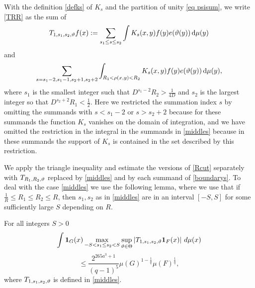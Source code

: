 With the definition \eqref{defks} of $K_s$
and the partition of unity \eqref{eq psisum}, we write \eqref{TRR} as the sum of
\begin{equation}\label{middles}
{T}_{1,s_1,s_2,\vartheta}f(x):=\sum_{s_1 \le s\le s_2}
\int K_s(x,y)  f(y) e(\vartheta(y)) \, \mathrm{d}\mu(y)
\end{equation}
and
\begin{equation}\label{boundarys}
\sum_{s=s_1-2,s_1-1, s_2+1, s_2+2}
\int_{R_1 <  \rho(x,y) < R_2}  K_s(x,y) f(y) e(\vartheta(y)) \,
 \mathrm{d}\mu(y),
\end{equation}
where $s_1$ is the smallest integer such that $D^{s_1-2}R_2>\frac 1{4D}$ and $s_2$
is the largest integer so that $D^{s_2+2}R_1<\frac 12$. Here we restricted the summation index $s$
by omitting the summands with $s<s_1-2$
or $s>s_2+2$ because for these summands the function $K_s$ vanishes on the domain of integration, and we have omitted the restriction in the integral
in the  summands in \eqref{middles} because in these summands the support of $K_s$ is contained in
the set described by this restriction.



We apply the triangle inequality and estimate the
versions of \eqref{Rcut} separately with $T_{R_1,R_2,\vartheta}$ replaced by
\eqref{middles} and by each summand of \eqref{boundarys}.
To deal with the case \eqref{middles} we use the following lemma, where we use that if
$\frac 1R\le R_1\le R_2\le R$, then $s_1,s_2$
as in \eqref{middles} are in an interval $[-S,S]$ for some
sufficiently large $S$ depending on $R$.


\begin{lemma}\label{S truncation}
For all integers $S>0$
$$
    \int \mathbf{1}_{G}(x)
    \max_{-S<s_1\le s_2<S}\sup_{\vartheta\in\Theta}
    \left| T_{1, s_1,s_2,\vartheta} \mathbf{1}_{F}(x) \right|\, d\mu(x)
$$
\begin{equation} \label{Scut}
    \leq \frac{2^{265a^3+1}}{(q-1)^5} \mu(G)^{1 - \frac{1}{q}} \mu(F)^{\frac{1}{q}},
\end{equation}
where $T_{1, s_1,s_2,\vartheta}$ is defined in \eqref{middles}.
\end{lemma}

